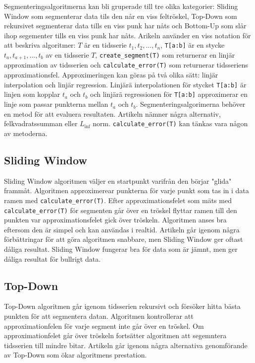\documentclass{article}
\newcommand{\tssubset}{\texttt{T[a:b]}}
\newcommand{\csegment}{\texttt{create_segment(T)}}
\newcommand{\calcerr}{\texttt{calculate_error(T)}}
\begin{document}
Segmenteringsalgoritmerna kan bli gruperade till tre olika kategorier: Sliding Window som segmenterar data tils den når en viss feltröskel, Top-Down som rekursivet segmenterar data tills en viss punk har nåts och Bottom-Up som slår ihop segementer tills en viss punk har nåts. Arikeln använder en viss notation för att beskriva algoritmer: $T$ är en tidsserie $t_1, t_2, ..., t_n$, \tssubset{} är en stycke $t_a, t_{a+1}, ..., t_b$ av en tidsserie $T$, \csegment{} som returnerar en linjär approximation av tidsserien och \calcerr{} som returnerar tidsseriens approximationsfel. Approximeringen kan göras på två olika sätt: linjär interpolation och linjär regression. Linjärä interpolationen för stycket \tssubset{} är linjen som kopplar $t_a$ och $t_b$ och linjärä regressionen för \tssubset{} approximerar en linje som passar punkterna mellan $t_a$ och $t_b$. Segmenteringsalgorimerna behöver en metod för att evaluera resultaten. Artikeln nämner några alternativ, felkvadratssumman eller $L_\inf$ norm. \calcerr{} kan tänkas vara någon av metoderna.
\bigskip

\subsection{Sliding Window}

Sliding Window algoritmen väljer en startpunkt varifrån den börjar "glida" frammåt. Algoritmen approximerear punkterna för varje punkt som tas in i data ramen med \calcerr{}. Efter approximationsfelet som mäts med \calcerr{} för segmenten går över en tröskel flyttar ramen till den punkten var approximationsfelet gick över tröskeln. Algoritmen anses bra eftersom den är simpel och kan användas i realtid. Artikeln går igenom några förbättringar för att göra algoritmen snabbare, men Sliding Window ger oftast dåliga resultat. Sliding Window fungerar bra för data som är jämnt, men ger dåliga resultat för bullrigt data.

\subsection{Top-Down}

Top-Down algoritmen går igenom tidsserien rekursivt och försöker hitta bästa punkten för att segmentera datan. Algoritmen kontrollerar att approximationfelen för varje segment inte går över en tröskel. Om approximationfelet går över tröskeln fortsätter algoritmen att segemntera tidsserien till mindre bitar. Artikeln går igenom några alternativa genomförande av Top-Down som ökar algoritmens prestation.
\end{document}
